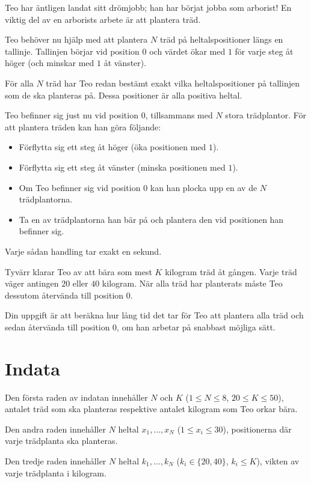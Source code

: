 
Teo har äntligen landat sitt drömjobb; han har börjat jobba som arborist!
En viktig del av en arborists arbete är att plantera träd.

Teo behöver nu hjälp med att plantera $N$ träd på heltalspositioner längs en tallinje.
Tallinjen börjar vid position $0$ och värdet ökar med $1$ för varje steg åt höger (och minskar med $1$ åt vänster).

För alla $N$ träd har Teo redan bestämt exakt vilka heltalspositioner på tallinjen som de ska planteras på.
Dessa positioner är alla positiva heltal.

Teo befinner sig just nu vid position $0$, tillsammans med $N$ stora trädplantor.
För att plantera träden kan han göra följande:
\begin{itemize}
  \item Förflytta sig ett steg åt höger (öka positionen med $1$).
  \item Förflytta sig ett steg åt vänster (minska positionen med $1$).
  \item Om Teo befinner sig vid position $0$ kan han plocka upp en av de $N$ trädplantorna.
  \item Ta en av trädplantorna han bär på och plantera den vid positionen han befinner sig.
\end{itemize}
Varje sådan handling tar exakt en sekund.

Tyvärr klarar Teo av att bära som mest $K$ kilogram träd åt gången.
Varje träd väger antingen $20$ eller $40$ kilogram.
När alla träd har planterats måste Teo dessutom återvända till position $0$.

Din uppgift är att beräkna hur lång tid det tar för Teo att plantera alla träd och sedan återvända till position $0$, om han arbetar på snabbast möjliga sätt.

\section*{Indata}
Den första raden av indatan innehåller $N$ och $K$ ($1 \leq N \leq 8$, $20 \leq K \leq 50$),
antalet träd som ska planteras respektive antalet kilogram som Teo orkar bära.

Den andra raden innehåller $N$ heltal $x_1, \dots, x_N$ ($1 \leq x_i \leq 30$), positionerna
där varje trädplanta ska planteras.

Den tredje raden innehåller $N$ heltal $k_1, \dots, k_N$ ($k_i \in \{20, 40\}$, $k_i \leq K$),
vikten av varje trädplanta i kilogram.

